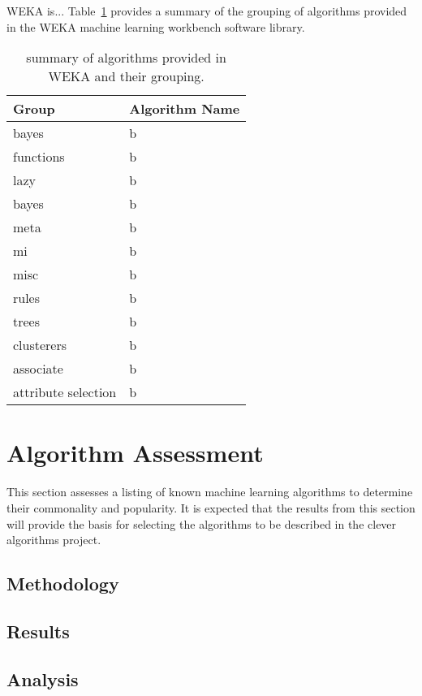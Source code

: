 \documentclass[a4paper, 11pt]{article}
\begin{document}
WEKA is...
Table~\ref{tab:weka} provides a summary of the grouping of algorithms provided in the WEKA machine learning workbench software library. 

\begin{table}[htp]
	\centering\footnotesize
		\begin{tabularx}{\textwidth}{lX}
		\toprule
		\textbf{Group} & \textbf{Algorithm Name} \\ 
		\toprule
		bayes & b \\
		functions & b \\
		lazy & b \\
		bayes & b \\
		meta & b \\
		mi & b \\
		misc & b \\
		rules & b \\
		trees & b \\
		clusterers & b \\
		associate & b \\
		attribute selection & b \\
		\bottomrule
		\end{tabularx}	
	\caption{summary of algorithms provided in WEKA and their grouping.}
	\label{tab:weka}
\end{table}


%
%
\section{Algorithm Assessment}
\label{sec:assessment}
This section assesses a listing of known machine learning algorithms to determine their commonality and popularity. It is expected that the results from this section will provide the basis for selecting the algorithms to be described in the clever algorithms project.

\subsection{Methodology}

\subsection{Results}

\subsection{Analysis}
\end{document}
